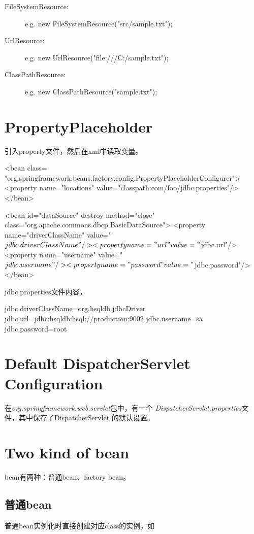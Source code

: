 \documentclass[a4paper,11pt]{article}
\begin{document}
\begin{description}
\item [FileSystemResource: ] e.g. new FileSystemResource("src/sample.txt");
\item [UrlResource: ] e.g. new UrlResource("file:///C:/sample.txt");
\item [ClassPathResource: ] e.g. new ClassPathResource("sample.txt");
\end{description}

\section[PropertyPlaceholder]{PropertyPlaceholder}
引入property文件，然后在xml中读取变量。

\begin{xmlcode}
<bean class=
      "org.springframework.beans.factory.config.PropertyPlaceholderConfigurer">
  <property name="locations" value="classpath:com/foo/jdbc.properties"/>
</bean>

<bean id="dataSource" destroy-method="close"
    class="org.apache.commons.dbcp.BasicDataSource">
  <property name="driverClassName" value="${jdbc.driverClassName}"/>
  <property name="url" value="${jdbc.url}"/>
  <property name="username" value="${jdbc.username}"/>
  <property name="password" value="${jdbc.password}"/>
</bean>
\end{xmlcode}

jdbc.properties文件内容，

\begin{bashcode}
jdbc.driverClassName=org.hsqldb.jdbcDriver
jdbc.url=jdbc:hsqldb:hsql://production:9002
jdbc.username=sa
jdbc.password=root
\end{bashcode}


\section[Default DispatcherServlet Configuration]{Default DispatcherServlet Configuration}
在\emph{org.springframework.web.servlet}包中，有一个
\emph{DispatcherServlet.properties}文件，其中保存了DispatcherServlet
的默认设置。

\section[Two kind of bean]{Two kind of bean}
bean有两种：普通bean、factory bean。

\subsection[普通bean]{普通bean}
普通bean实例化时直接创建对应class的实例，如
\end{document}
